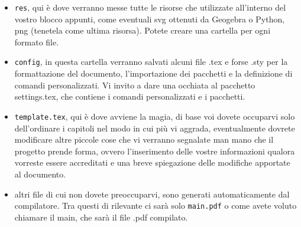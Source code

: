 \begin{itemize}
\begin{itemize}
	\end{itemize}
	\item \texttt{res}, qui è dove verranno messe tutte le risorse che utilizzate all'interno del vostro blocco appunti, come eventuali svg ottenuti da Geogebra o Python, png (tenetela come ultima risorsa). Potete creare una cartella per ogni formato file.
	\item \texttt{config}, in questa cartella verranno salvati alcuni file .tex e forse .sty per la formattazione del documento, l'importazione dei pacchetti e la definizione di comandi personalizzati. Vi invito a dare una occhiata al pacchetto settings.tex, che contiene i comandi personalizzati e i pacchetti.
	\item \texttt{template.tex}, qui è dove avviene la magia, di base voi dovete occuparvi solo dell'ordinare i capitoli nel modo in cui più vi aggrada, eventualmente dovrete modificare altre piccole cose che vi verranno segnalate man mano che il progetto prende forma, ovvero l'inserimento delle vostre informazioni qualora vorreste essere accreditati e una breve spiegazione delle modifiche apportate al documento.
	\item altri file di cui non dovete preoccuparvi, sono generati automaticamente dal compilatore. Tra questi di rilevante ci sarà solo \texttt{main.pdf} o come avete voluto chiamare il main, che sarà il file .pdf compilato.
\end{itemize}